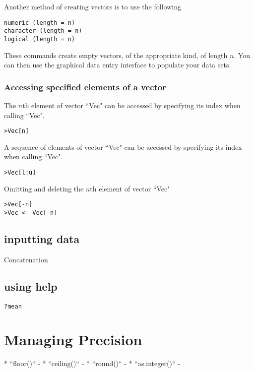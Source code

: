 Another method of creating vectors is to use the following
\begin{verbatim}
numeric (length = n)
character (length = n)
logical (length = n)
\end{verbatim}
These commands create empty vectors, of the appropriate kind, of length $n$. You can then use the graphical data entry interface to populate your data sets.

\subsubsection{Accessing specified elements of a vector}

The $n$th element of vector ``Vec" can be accessed by specifying its index when
calling ``Vec".
\begin{verbatim}>Vec[n]
\end{verbatim}
A sequence of  elements of vector ``Vec" can be accessed by specifying its index
when calling ``Vec".
\begin{verbatim}>Vec[l:u]
\end{verbatim}
Omitting and deleting the $n$th element of vector ``Vec"
\begin{verbatim}
>Vec[-n]
>Vec <- Vec[-n]
\end{verbatim}



\subsection{inputting data}
Concatenation

\subsection{using help}

\begin{framed}
\begin{verbatim}
?mean
\end{verbatim}
\end{framed}



\newpage
\section{Managing Precision}
\begin{itemize}
*  ``floor()`` - 
*  ``ceiling()`` - 
*  ``round()`` - 
*  ``as.integer()`` -
\end{itemize}


